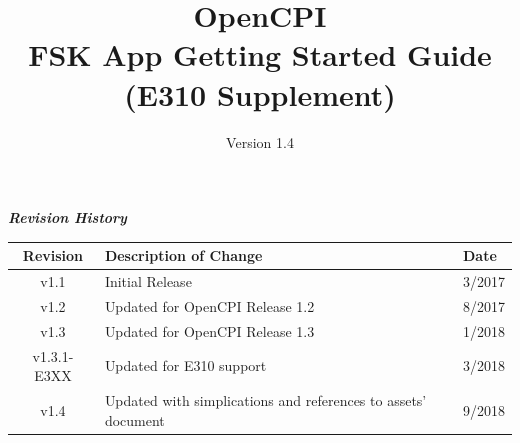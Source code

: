 \def\docTitle{OpenCPI\\ FSK App Getting Started Guide\\ (E310 Supplement)}
\def\docVersion{1.4}

\date{Version \docVersion} %
\title{\docTitle}
\usepackage[T1]{fontenc} %
\usepackage{graphicx}
\graphicspath{ {figures/} }
\usepackage{textcomp}

\maketitle
\newpage

	\begin{center}
	\textit{\textbf{Revision History}}
		\begin{table}[H]
		\label{table:revisions} %
			\begin{tabularx}{\textwidth}{|c|X|l|}
			\hline
			\rowcolor{blue}
			\textbf{Revision} & \textbf{Description of Change} & \textbf{Date} \\
		    \hline
		    v1.1 & Initial Release & 3/2017 \\
		    \hline
		    v1.2 & Updated for OpenCPI Release 1.2 & 8/2017 \\
			\hline
			v1.3 & Updated for OpenCPI Release 1.3 & 1/2018 \\
			\hline
			v1.3.1-E3XX & Updated for E310 support & 3/2018 \\
			\hline
			v1.4 & Updated with simplications and references to assets' document & 9/2018 \\
			\hline
			\end{tabularx}
		\end{table}
	\end{center}


